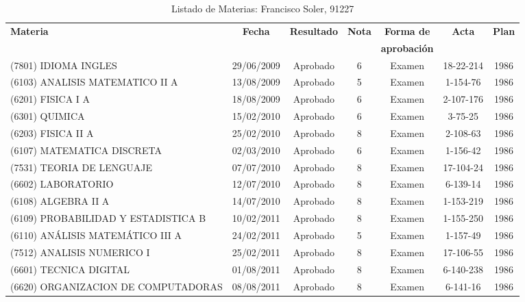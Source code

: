 
\begin{table}[htb]
  \scriptsize
  \centering
  \caption{Listado de Materias: Francisco Soler, 91227}
  \begin{tabular}{p{4cm} *{6}{c}}
  \toprule
  \textbf{Materia} & \textbf{Fecha} & \textbf{Resultado} & \textbf{Nota} & \textbf{Forma de} & \textbf{Acta} & \textbf{Plan} \tabularnewline
   & & & & \textbf{aprobación} & & \tabularnewline
  \midrule
  
    (7801) IDIOMA INGLES & 29/06/2009 & Aprobado & 6 & Examen & 18-22-214 & 1986 \tabularnewline

    (6103) ANALISIS MATEMATICO II A & 13/08/2009 & Aprobado & 5 & Examen & 1-154-76 & 1986 \tabularnewline

    (6201) FISICA I A & 18/08/2009 & Aprobado & 6 & Examen & 2-107-176 & 1986 \tabularnewline

    (6301) QUIMICA & 15/02/2010 & Aprobado & 6 & Examen & 3-75-25 & 1986 \tabularnewline

    (6203) FISICA II A & 25/02/2010 & Aprobado & 8 & Examen & 2-108-63 & 1986 \tabularnewline

    (6107) MATEMATICA DISCRETA & 02/03/2010 & Aprobado & 6 & Examen & 1-156-42 & 1986 \tabularnewline

    (7531) TEORIA DE LENGUAJE & 07/07/2010 & Aprobado & 8 & Examen & 17-104-24 & 1986 \tabularnewline

    (6602) LABORATORIO & 12/07/2010 & Aprobado & 8 & Examen & 6-139-14 & 1986 \tabularnewline

    (6108) ALGEBRA II A & 14/07/2010 & Aprobado & 8 & Examen & 1-153-219 & 1986 \tabularnewline

    (6109) PROBABILIDAD Y ESTADISTICA B & 10/02/2011 & Aprobado & 8 & Examen & 1-155-250 & 1986 \tabularnewline

    (6110) ANÁLISIS MATEMÁTICO III A & 24/02/2011 & Aprobado & 5 & Examen & 1-157-49 & 1986 \tabularnewline

    (7512) ANALISIS NUMERICO I & 25/02/2011 & Aprobado & 8 & Examen & 17-106-55 & 1986 \tabularnewline

    (6601) TECNICA DIGITAL & 01/08/2011 & Aprobado & 8 & Examen & 6-140-238 & 1986 \tabularnewline

    (6620) ORGANIZACION DE COMPUTADORAS & 08/08/2011 & Aprobado & 8 & Examen & 6-141-16 & 1986 \tabularnewline


\end{tabular}
\end{table}
